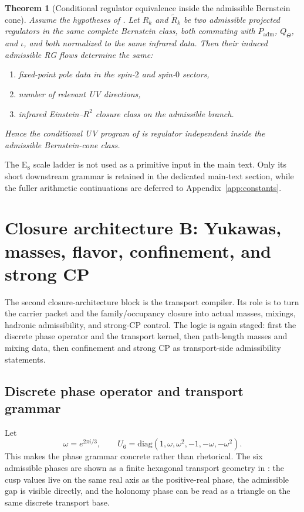 \documentclass[11pt,a4paper]{article}
\newtheorem{theorem}{Theorem}[section]
\theoremstyle{definition}
\theoremstyle{remark}
\newcommand{\inv}{\iota}
\newcommand{\Padm}{P_{\mathrm{adm}}}
\begin{document}
\begin{theorem}[Conditional regulator equivalence inside the admissible Bernstein cone]
\label{thm:regulator-equivalence-bernstein-cone}
Assume the hypotheses of . Let $R_k$ and
$\widetilde R_k$ be two admissible projected regulators in the same complete Bernstein class,
both commuting with $\Padm$, $Q_\Theta$, and $\inv$, and both normalized to the same infrared
data. Then their induced admissible RG flows determine the same:
\begin{enumerate}[label=(\roman*), leftmargin=1.5em, topsep=3pt, itemsep=2pt]
    \item fixed-point pole data in the spin-$2$ and spin-$0$ sectors,
    \item number of relevant UV directions,
    \item infrared Einstein--$R^2$ closure class on the admissible branch.
\end{enumerate}
Hence the conditional UV program of  is regulator
independent inside the admissible Bernstein-cone class.
\end{theorem}

The E$_8$ scale ladder is not used as a primitive input in the main text. Only its short downstream grammar is retained in the dedicated main-text section, while the fuller arithmetic continuations are deferred to Appendix~\ref{app:constants}.

\section{Closure architecture B: Yukawas, masses, flavor, confinement, and strong CP}

The second closure-architecture block is the transport compiler. Its role is to turn the carrier packet and the family/occupancy closure into actual masses, mixings, hadronic admissibility, and strong-CP control. The logic is again staged: first the discrete phase operator and the transport kernel, then path-length masses and mixing data, then confinement and strong CP as transport-side admissibility statements.

\subsection{Discrete phase operator and transport grammar}

Let
\[
\omega=e^{2\pi i/3},
\qquad
U_6=\mathrm{diag}(1,\omega,\omega^2,-1,-\omega,-\omega^2).
\]
This makes the phase grammar concrete rather than rhetorical. The six admissible phases are shown as a finite hexagonal transport geometry in : the cusp values live on the same real axis as the positive-real phase, the admissible gap is visible directly, and the holonomy phase can be read as a triangle on the same discrete transport base.
\end{document}
